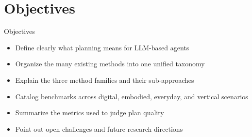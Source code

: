 \documentclass[10pt]{beamer}
\begin{document}
\section{Objectives}
\begin{frame}{Objectives}
\begin{itemize}
  \item Define clearly what planning means for LLM-based agents
  \item Organize the many existing methods into one unified taxonomy
  \item Explain the three method families and their sub-approaches
  \item Catalog benchmarks across digital, embodied, everyday, and vertical scenarios
  \item Summarize the metrics used to judge plan quality
  \item Point out open challenges and future research directions
\end{itemize}
\end{frame}
\end{document}
